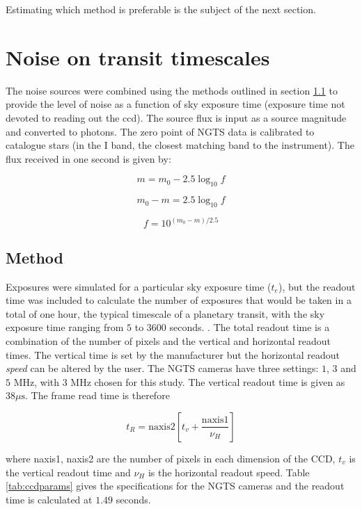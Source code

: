 \documentclass[a4paper]{report}
\begin{document}
Estimating which method is preferable is the subject of the next
section.

\section{Noise on transit timescales}

The noise sources were combined using the methods outlined in section
\ref{sec:method} to provide the level of noise as a function of sky
exposure time (exposure time not devoted to reading out the ccd). The
source flux is input as a source magnitude and converted to photons. The
zero point of NGTS data is calibrated to catalogue stars (in the I band,
the closest matching band to the instrument). The flux received in one
second is given by:

\[
    m = m_0 - 2.5 \log_{10}{f}
    \]

\[
    m_0 - m = 2.5 \log_{10}{f}
\]

\[
    f = 10^{(m_0 - m) / 2.5}
    \]


\subsection{Method}
\label{sec:method}

Exposures were simulated for a particular sky exposure time ($t_e$), 
but the
readout time was included to calculate the number of exposures that
would be taken in a total of one hour, the typical timescale of a
planetary transit, with the sky exposure time ranging from $5$ to $3600$
seconds. . The total readout time is a combination of the number
of pixels and the vertical and horizontal readout times. The vertical
time is set by the manufacturer but the horizontal readout \emph{speed}
can be altered by the user. The NGTS cameras have three settings: $1$,
$3$ and $5$ MHz, with $3$ MHz chosen for this study. The vertical
readout time is given as $38 \mu\mathrm{s}$. The frame read time is
therefore

\[
    t_R = \mathrm{naxis2} \left[t_v + \frac{\mathrm{naxis1}}{\nu_H}\right]
    \]

where naxis1, naxis2 are the number of pixels in each dimension of the
CCD, $t_v$ is the vertical readout time and $\nu_H$ is the horizontal
readout speed. Table \ref{tab:ccdparams} gives the specifications for
the NGTS cameras and the readout time is calculated at $1.49$ seconds.
\end{document}
